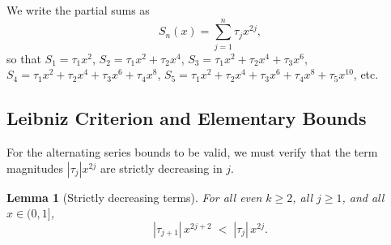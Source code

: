 \documentclass[12pt,a4paper]{article}
\theoremstyle{plain}
\newtheorem{lemma}[theorem]{Lemma}
\theoremstyle{definition}
\begin{document}
We write the partial sums as
\[
  S_n(x) = \sum_{j=1}^{n} \tau_j x^{2j},
\]
so that $S_1 = \tau_1 x^2$, $S_2 = \tau_1 x^2 + \tau_2 x^4$,
$S_3 = \tau_1 x^2 + \tau_2 x^4 + \tau_3 x^6$,
$S_4 = \tau_1 x^2 + \tau_2 x^4 + \tau_3 x^6 + \tau_4 x^8$,
$S_5 = \tau_1 x^2 + \tau_2 x^4 + \tau_3 x^6 + \tau_4 x^8 + \tau_5 x^{10}$,
etc.

\subsection{Leibniz Criterion and Elementary Bounds}
\label{sec:leibniz}

For the alternating series bounds to be valid, we must verify that the
term magnitudes $|\tau_j| x^{2j}$ are strictly decreasing in $j$.

\begin{lemma}[Strictly decreasing terms]\label{lem:terms-decreasing}
  For all even $k \ge 2$, all $j \ge 1$, and all $x \in (0,1]$,
  \[
    |\tau_{j+1}| \, x^{2j+2} \; < \; |\tau_j| \, x^{2j}.
  \]
\end{lemma}
\end{document}
